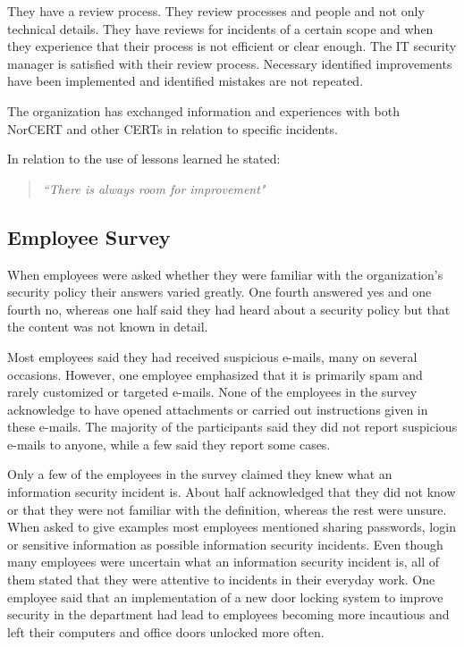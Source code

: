 \documentclass[b5paper, twoside, openright, 11pt]{report}
\begin{document}
They have a review process. They review processes and people and not only technical details. They have reviews for incidents of a certain scope and when they experience that their process is not efficient or clear enough. The IT security manager is satisfied with their review process. Necessary identified improvements have been implemented and identified mistakes are not repeated.

The organization has exchanged information and experiences with both \acs{NorCERT} and other \acp{CERT} in relation to specific incidents.

In relation to the use of lessons learned he stated: 

\begin{quote}
\textit{``There is always room for improvement"}
\end{quote}

\subsection{Employee Survey}
When employees were asked whether they were familiar with the organization's security policy their answers varied greatly. One fourth answered yes and one fourth no, whereas one half said they had heard about a security policy but that the content was not known in detail. 

Most employees said they had received suspicious e-mails, many on several occasions. However, one employee emphasized that it is primarily spam and rarely customized or targeted e-mails. None of the employees in the survey acknowledge to have opened attachments or carried out instructions given in these e-mails. The majority of the participants said they did not report suspicious e-mails to anyone, while a few said they report some cases.

Only a few of the employees in the survey claimed they knew what an information security incident is. About half acknowledged that they did not know or that they were not familiar with the definition, whereas the rest were unsure. When asked to give examples most employees mentioned sharing passwords, login or sensitive information as possible information security incidents. Even though many employees were uncertain what an information security incident is, all of them stated that they were attentive to incidents in their everyday work. One employee said that an implementation of a new door locking system to improve security in the department had lead to employees becoming more incautious and left their computers and office doors unlocked more often.
\end{document}
